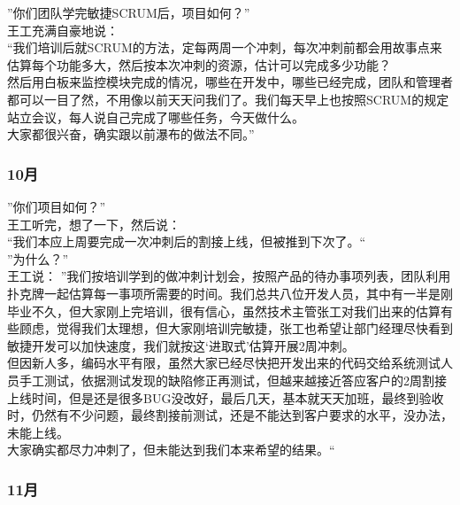 \documentclass{book}        %
\begin{document}
''你们团队学完敏捷SCRUM后，项目如何？''\\
王工充满自豪地说：\\
``我们培训后就SCRUM的方法，定每两周一个冲刺，每次冲刺前都会用故事点来估算每个功能多大，然后按本次冲刺的资源，估计可以完成多少功能？\\
然后用白板来监控模块完成的情况，哪些在开发中，哪些已经完成，团队和管理者都可以一目了然，不用像以前天天问我们了。我们每天早上也按照SCRUM的规定站立会议，每人说自己完成了哪些任务，今天做什么。\\
大家都很兴奋，确实跟以前瀑布的做法不同。''

\hypertarget{ux6708-3}{%
\subsubsection{10月}\label{ux6708-3}}

''你们项目如何？''\\
王工听完，想了一下，然后说：\\
``我们本应上周要完成一次冲刺后的割接上线，但被推到下次了。``\\
''为什么？''\\
王工说：
''我们按培训学到的做冲刺计划会，按照产品的待办事项列表，团队利用扑克牌一起估算每一事项所需要的时间。我们总共八位开发人员，其中有一半是刚毕业不久，但大家刚上完培训，很有信心，虽然技术主管张工对我们出来的估算有些顾虑，觉得我们太理想，但大家刚培训完敏捷，张工也希望让部门经理尽快看到敏捷开发可以加快速度，我们就按这`进取式'估算开展2周冲刺。\\
但因新人多，编码水平有限，虽然大家已经尽快把开发出来的代码交给系统测试人员手工测试，依据测试发现的缺陷修正再测试，但越来越接近答应客户的2周割接上线时间，但是还是很多BUG没改好，最后几天，基本就天天加班，最终到验收时，仍然有不少问题，最终割接前测试，还是不能达到客户要求的水平，没办法，未能上线。\\
大家确实都尽力冲刺了，但未能达到我们本来希望的结果。``

\hypertarget{ux6708-4}{%
\subsubsection{11月}\label{ux6708-4}}
\end{document}
